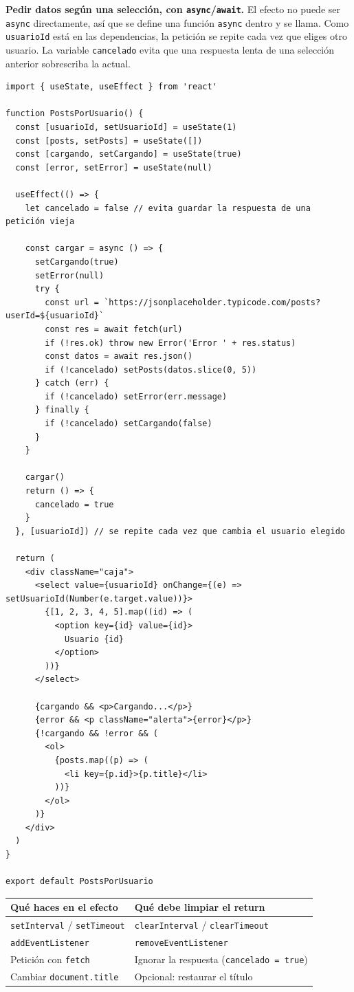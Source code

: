 \documentclass[11pt,a4paper]{article}
\newcommand{\cmd}[1]{\texttt{\color{reactdark}#1}}
\begin{document}
\textbf{Pedir datos según una selección, con \texttt{async}/\texttt{await}.} El efecto no puede ser \cmd{async} directamente, así que se define una función \cmd{async} dentro y se llama. Como \cmd{usuarioId} está en las dependencias, la petición se repite cada vez que eliges otro usuario. La variable \cmd{cancelado} evita que una respuesta lenta de una selección anterior sobrescriba la actual.

\begin{lstlisting}[language=JSX,title={\small\ttfamily src/components/efectos/PostsPorUsuario.jsx}]
import { useState, useEffect } from 'react'

function PostsPorUsuario() {
  const [usuarioId, setUsuarioId] = useState(1)
  const [posts, setPosts] = useState([])
  const [cargando, setCargando] = useState(true)
  const [error, setError] = useState(null)

  useEffect(() => {
    let cancelado = false // evita guardar la respuesta de una petición vieja

    const cargar = async () => {
      setCargando(true)
      setError(null)
      try {
        const url = `https://jsonplaceholder.typicode.com/posts?userId=${usuarioId}`
        const res = await fetch(url)
        if (!res.ok) throw new Error('Error ' + res.status)
        const datos = await res.json()
        if (!cancelado) setPosts(datos.slice(0, 5))
      } catch (err) {
        if (!cancelado) setError(err.message)
      } finally {
        if (!cancelado) setCargando(false)
      }
    }

    cargar()
    return () => {
      cancelado = true
    }
  }, [usuarioId]) // se repite cada vez que cambia el usuario elegido

  return (
    <div className="caja">
      <select value={usuarioId} onChange={(e) => setUsuarioId(Number(e.target.value))}>
        {[1, 2, 3, 4, 5].map((id) => (
          <option key={id} value={id}>
            Usuario {id}
          </option>
        ))}
      </select>

      {cargando && <p>Cargando...</p>}
      {error && <p className="alerta">{error}</p>}
      {!cargando && !error && (
        <ol>
          {posts.map((p) => (
            <li key={p.id}>{p.title}</li>
          ))}
        </ol>
      )}
    </div>
  )
}

export default PostsPorUsuario
\end{lstlisting}

\begin{center}
\small
\begin{tabular}{p{5cm} p{7.6cm}}
\toprule
\textbf{Qué haces en el efecto} & \textbf{Qué debe limpiar el return} \\
\midrule
\cmd{setInterval} / \cmd{setTimeout} & \cmd{clearInterval} / \cmd{clearTimeout} \\
\cmd{addEventListener} & \cmd{removeEventListener} \\
Petición con \cmd{fetch} & Ignorar la respuesta (\cmd{cancelado = true}) \\
Cambiar \cmd{document.title} & Opcional: restaurar el título \\
\bottomrule
\end{tabular}
\end{center}
\end{document}
